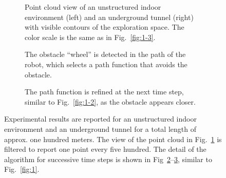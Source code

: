 \documentclass[letterpaper,10pt,conference,twoside]{IEEEtran}
\theoremstyle{definition}
\begin{document}
\begin{figure*}[t]
  \vspace*{-.4cm}
  \begin{subfigure}[m]{0.48\textwidth}
    \centering
    \hspace*{-1.2cm}
    
    \caption{Point cloud view of an unstructured indoor environment (left) and an underground tunnel (right) with visible contours of the exploration space. The color scale is the same as in Fig.~\ref{fig:1-3}.}
    \label{fig:2-1}
  \end{subfigure}
  \hfill
  \begin{subfigure}[m]{0.25\textwidth}
    \centering
    
    \caption{The obstacle ``wheel'' is detected in the path of the robot, which selects a path function that avoids the obstacle.}
    \vspace*{-1cm}
    \label{fig:2-2}
  \end{subfigure}
  \hfill
  \begin{subfigure}[m]{0.25\textwidth}
    \centering
    
    \caption{The path function is refined at the next time step, similar to Fig.~\ref{fig:1-2}, as the obstacle appears closer.}
    \vspace*{-1cm}
    \label{fig:2-3}
  \end{subfigure}
  \caption{Experimental results are reported for an unstructured indoor environment and an underground tunnel for a total length of approx. one hundred meters. The view of the point cloud in Fig.~\ref{fig:2-1} is filtered to report one point every five hundred. The detail of the algorithm for successive time steps is shown in Fig~\ref{fig:2-2}--\ref{fig:2-3}, similar to Fig.~\ref{fig:1}.}
  \label{fig:2}
  \vspace*{-.5cm}
\end{figure*}
\end{document}
